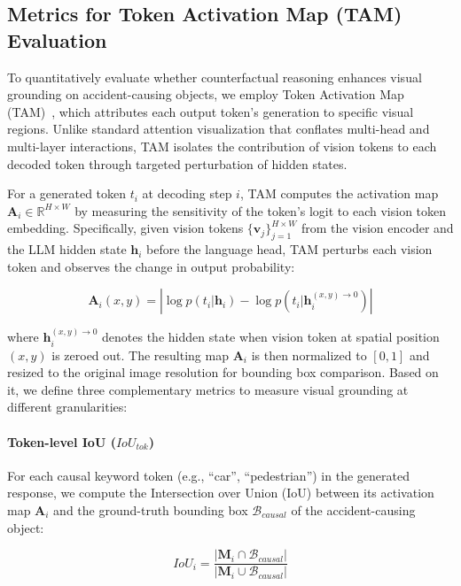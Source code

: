 \documentclass{article}
\begin{document}
\subsection{Metrics for Token Activation Map (TAM) Evaluation}
\label{appendix:implementations_iou_metrics}

To quantitatively evaluate whether counterfactual reasoning 
enhances visual grounding on accident-causing objects, we 
employ Token Activation Map (TAM)~\cite{attention:tam}, 
which attributes each output token's generation to specific 
visual regions. Unlike standard attention visualization that 
conflates multi-head and multi-layer interactions, TAM 
isolates the contribution of vision tokens to each decoded 
token through targeted perturbation of hidden states.


For a generated token $t_i$ at decoding step $i$, TAM 
computes the activation map $\mathbf{A}_i \in \mathbb{R}^{H \times W}$ 
by measuring the sensitivity of the token's logit to each 
vision token embedding. Specifically, given vision tokens 
$\{\mathbf{v}_j\}_{j=1}^{H \times W}$ from the vision encoder 
and the LLM hidden state $\mathbf{h}_i$ before the language 
head, TAM perturbs each vision token and observes the change 
in output probability:

\begin{equation}
\mathbf{A}_i(x, y) = \left| \log p(t_i | \mathbf{h}_i) - 
\log p(t_i | \mathbf{h}_i^{(x,y)\to 0}) \right|
\end{equation}

where $\mathbf{h}_i^{(x,y)\to 0}$ denotes the hidden state 
when vision token at spatial position $(x, y)$ is zeroed out. 
The resulting map $\mathbf{A}_i$ is then normalized to 
$[0, 1]$ and resized to the original image resolution for 
bounding box comparison. Based on it, we define three complementary metrics to measure visual grounding at different granularities:

\paragraph{Token-level IoU ($IoU_{tok}$)}
For each causal keyword token (e.g., ``car'', ``pedestrian'') 
in the generated response, we compute the Intersection over 
Union (IoU) between its activation map $\mathbf{A}_i$ and 
the ground-truth bounding box $\mathcal{B}_{causal}$ of the 
accident-causing object:

\begin{equation}
IoU_i = \frac{|\mathbf{M}_i \cap \mathcal{B}_{causal}|}
{|\mathbf{M}_i \cup \mathcal{B}_{causal}|}
\end{equation}
\end{document}
